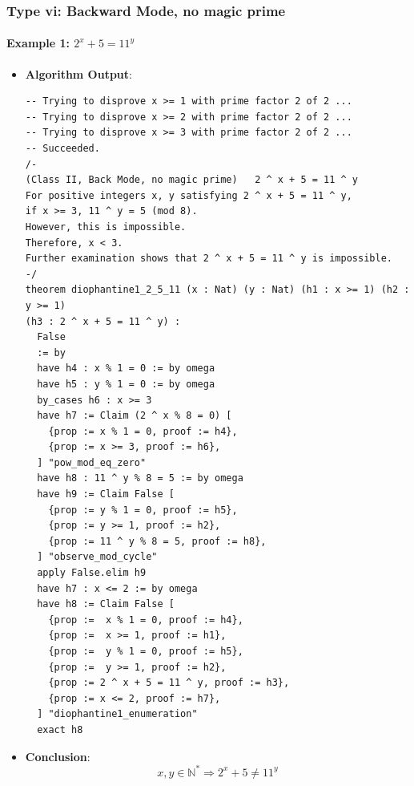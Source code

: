 \documentclass{article}
\begin{document}
\subsubsection{Type vi: Backward Mode, no magic prime}
\paragraph{Example 1: $2^x+5=11^y$}
\begin{itemize}
\item \textbf{Algorithm Output}:
    \begin{verbatim}
-- Trying to disprove x >= 1 with prime factor 2 of 2 ...
-- Trying to disprove x >= 2 with prime factor 2 of 2 ...
-- Trying to disprove x >= 3 with prime factor 2 of 2 ...
-- Succeeded.
/-
(Class II, Back Mode, no magic prime)   2 ^ x + 5 = 11 ^ y
For positive integers x, y satisfying 2 ^ x + 5 = 11 ^ y,
if x >= 3, 11 ^ y = 5 (mod 8).
However, this is impossible.
Therefore, x < 3.
Further examination shows that 2 ^ x + 5 = 11 ^ y is impossible.
-/
theorem diophantine1_2_5_11 (x : Nat) (y : Nat) (h1 : x >= 1) (h2 : y >= 1) 
(h3 : 2 ^ x + 5 = 11 ^ y) :    
  False
  := by
  have h4 : x % 1 = 0 := by omega
  have h5 : y % 1 = 0 := by omega
  by_cases h6 : x >= 3
  have h7 := Claim (2 ^ x % 8 = 0) [
    {prop := x % 1 = 0, proof := h4},
    {prop := x >= 3, proof := h6},
  ] "pow_mod_eq_zero"
  have h8 : 11 ^ y % 8 = 5 := by omega
  have h9 := Claim False [
    {prop := y % 1 = 0, proof := h5},
    {prop := y >= 1, proof := h2},
    {prop := 11 ^ y % 8 = 5, proof := h8},
  ] "observe_mod_cycle"
  apply False.elim h9
  have h7 : x <= 2 := by omega
  have h8 := Claim False [
    {prop :=  x % 1 = 0, proof := h4},
    {prop :=  x >= 1, proof := h1},
    {prop :=  y % 1 = 0, proof := h5},
    {prop :=  y >= 1, proof := h2},
    {prop := 2 ^ x + 5 = 11 ^ y, proof := h3},
    {prop := x <= 2, proof := h7},
  ] "diophantine1_enumeration"
  exact h8
    \end{verbatim}
    \item \textbf{Conclusion}:
    \[ x, y \in \mathbb{N}^* \Rightarrow 2^x+5 \neq 11^y \]
\end{itemize}
\end{document}
